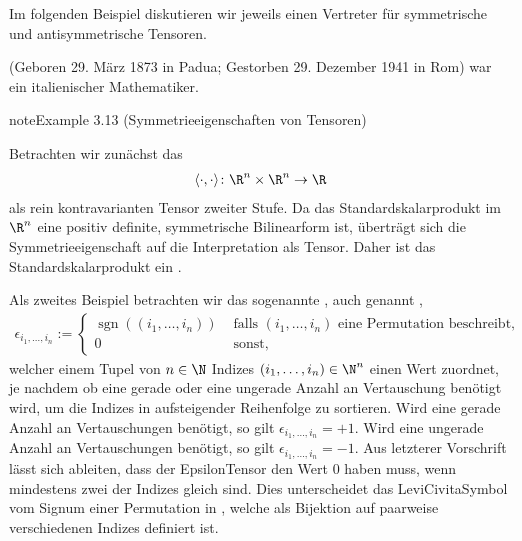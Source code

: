\documentclass[letterpaper,10pt,german]{jupyterBook}
\begin{document}
\sphinxAtStartPar
Im folgenden Beispiel diskutieren wir jeweils einen Vertreter für symmetrische und antisymmetrische Tensoren.

\begin{sphinxShadowBox}

\sphinxAtStartPar
{} (Geboren 29. März 1873 in Padua; Gestorben 29. Dezember 1941 in Rom) war ein italienischer Mathematiker.
\end{sphinxShadowBox}
\label{vektoranalysis/tensor:example-29}
\begin{sphinxadmonition}{note}{Example 3.13 (Symmetrieeigenschaften von Tensoren)}



\sphinxAtStartPar
Betrachten wir zunächst das 
\begin{equation*}
\begin{split}\langle \cdot, \cdot \rangle \colon \R^n \times \R^n \rightarrow \R\end{split}
\end{equation*}
\sphinxAtStartPar
als rein kontravarianten Tensor zweiter Stufe.
Da das Standardskalarprodukt im \(\R^n\) eine positiv definite, symmetrische Bilinearform ist, überträgt sich die Symmetrieeigenschaft auf die Interpretation als Tensor.
Daher ist das Standardskalarprodukt ein .



\sphinxAtStartPar
Als zweites Beispiel betrachten wir das sogenannte , auch genannt ,
\begin{equation*}
\begin{split}\epsilon_{i_1,\ldots,i_n} :=
\begin{cases}
\operatorname{sgn}((i_1,\ldots,i_n))&\text{ falls }(i_1,\ldots,i_n)\text{ eine Permutation beschreibt,}\\
0&\text{ sonst,}
\end{cases}\end{split}
\end{equation*}
\sphinxAtStartPar
welcher einem Tupel von \(n\in\N\) Indizes \((i_1,\ldots,i_n) \in \N^n\) einen Wert zuordnet, je nachdem ob eine gerade oder eine ungerade Anzahl an Vertauschung benötigt wird, um die Indizes in aufsteigender Reihenfolge zu sortieren.
Wird eine gerade Anzahl an Vertauschungen benötigt, so gilt \(\epsilon_{i_1,\ldots,i_n} = +1\).
Wird eine ungerade Anzahl an Vertauschungen benötigt, so gilt \(\epsilon_{i_1,\ldots,i_n} = -1\).
Aus letzterer Vorschrift lässt sich ableiten, dass der Epsilon\sphinxhyphen{}Tensor den Wert \(0\) haben muss, wenn mindestens zwei der Indizes gleich sind.
Dies unterscheidet das Levi\sphinxhyphen{}Civita\sphinxhyphen{}Symbol vom Signum einer Permutation in {\hyperref[\detokenize{vektoranalysis/tensor:def:signumPermutation}]{}}, welche als Bijektion auf paarweise verschiedenen Indizes definiert ist.


\end{sphinxadmonition}
\end{document}

